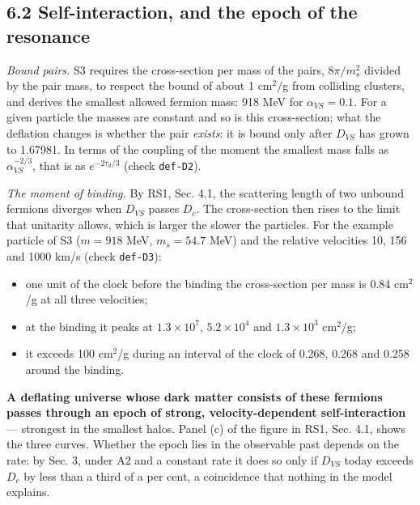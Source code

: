 \documentclass[
  10pt,
]{article}
\providecommand{\tightlist}{%
  \setlength{\itemsep}{0pt}\setlength{\parskip}{0pt}}
\begin{document}
\hypertarget{self-interaction-and-the-epoch-of-the-resonance}{%
\subsection{6.2 Self-interaction, and the epoch of the
resonance}\label{self-interaction-and-the-epoch-of-the-resonance}}

\emph{Bound pairs.} S3 requires the cross-section per mass of the pairs,
\(8\pi/m_s^2\) divided by the pair mass, to respect the bound of about 1
cm\(^2\)/g from colliding clusters, and derives the smallest allowed
fermion mass: 918 MeV for \(\alpha_{VS}=0.1\). For a given particle the
masses are constant and so is this cross-section; what the deflation
changes is whether the pair \emph{exists}: it is bound only after
\(D_{VS}\) has grown to 1.67981. In terms of the coupling of the moment
the smallest mass falls as \(\alpha_{VS}^{-2/3}\), that is as
\(e^{-2\tau_d/3}\) (check \texttt{def-D2}).

\emph{The moment of binding.} By RS1, Sec. 4.1, the scattering length of
two unbound fermions diverges when \(D_{VS}\) passes \(D_c\). The
cross-section then rises to the limit that unitarity allows, which is
larger the slower the particles. For the example particle of S3
(\(m=918\) MeV, \(m_s=54.7\) MeV) and the relative velocities 10, 156
and 1000 km/s (check \texttt{def-D3}):

\begin{itemize}
\tightlist
\item
  one unit of the clock before the binding the cross-section per mass is
  0.84 cm\(^2\)/g at all three velocities;
\item
  at the binding it peaks at \(1.3\times10^{7}\), \(5.2\times10^{4}\)
  and \(1.3\times10^{3}\) cm\(^2\)/g;
\item
  it exceeds 100 cm\(^2\)/g during an interval of the clock of 0.268,
  0.268 and 0.258 around the binding.
\end{itemize}

\textbf{A deflating universe whose dark matter consists of these
fermions passes through an epoch of strong, velocity-dependent
self-interaction} --- strongest in the smallest halos. Panel (c) of the
figure in RS1, Sec. 4.1, shows the three curves. Whether the epoch lies
in the observable past depends on the rate: by Sec. 3, under A2 and a
constant rate it does so only if \(D_{VS}\) today exceeds \(D_c\) by
less than a third of a per cent, a coincidence that nothing in the model
explains.
\end{document}
